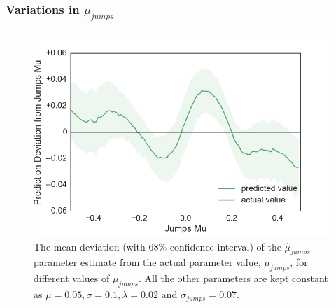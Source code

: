 \documentclass[11pt,oneside,openany,a4paper,english, report, goldenblock
]{usthesis}
\begin{document}
\clearpage
\subsubsection{Variations in $\mu_{jumps}$}
\begin{figure}[h]
	\centering
	\includegraphics[width=0.43\linewidth]{Images/Output-Sensitivity-Results/ConvolutionalNN-MultipleOutput-ELU/Varying-Jumps_mu/Jumps_Mu}
	\caption{The mean deviation (with $68\%$ confidence interval) of the $\hat{\mu}_{jumps}$ parameter estimate from the actual parameter value, $\mu_{jumps}$, for different values of $\mu_{jumps}$. All the other parameters are kept constant as $\mu = 0.05, \sigma = 0.1, \lambda = 0.02$ and $\sigma_{jumps} = 0.07$.}
	\label{fig:appendix:sensitivity_test:multiple_output:varying_jumps_mu:jumps_mu}
\end{figure}
\end{document}
